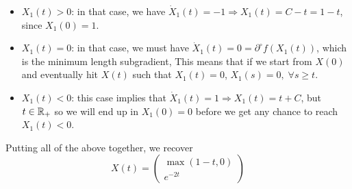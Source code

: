 \documentclass[10pt]{article}
\begin{document}
\begin{Exercise}
\begin{itemize}
        \item $X_1(t) > 0$: in that case, we have $\dot{X}_1(t) = -1 \Rightarrow
            X_1(t) = C - t = 1 - t$, since $X_1(0) = 1$.
        \item $X_1(t) = 0$: in that case, we must have $\dot{X}_1(t) =
            0 = \partial^{\circ} f(X_1(t))$, which is the minimum length
            subgradient, This means that if we start from $X(0)$ and eventually
            hit $X(t)$ such that $X_1(t) = 0$, $X_1(s) = 0, \; \forall s \geq
            t$.
        \item $X_1(t) < 0$: this case implies that
            $\dot{X}_1(t) = 1 \Rightarrow X_1(t) = t + C$, but $t \in \mathbb{R}_+$
            so we will end up in $X_1(0) = 0$ before we get any chance to reach
            $X_1(t) < 0$.
        \end{itemize}
        Putting all of the above together, we recover
        \[
            X(t) = \begin{pmatrix}
                    \max(1 - t, 0) \\
                    e^{-2t}
                \end{pmatrix}
        \]
	\ExePart


\end{Exercise}
\end{document}
